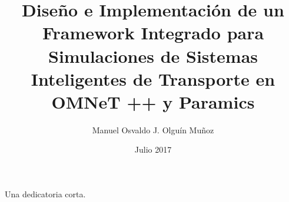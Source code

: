 \documentclass[upright, contnum, latin1]{umemoria}
\author{Manuel Osvaldo J. Olguín Muñoz}
\title{Diseño e Implementación de un Framework Integrado para Simulaciones de Sistemas Inteligentes de Transporte en OMNeT ++ y Paramics}
\date{Julio 2017}
\begin{document}
\frontmatter
\maketitle

\begin{abstract}
\lipsum[1-4]
\end{abstract}

\begin{dedicatoria}
Una dedicatoria corta.
\end{dedicatoria}

\begin{thanks}
\lipsum[1-2]
\end{thanks}

\cleardoublepage
\tableofcontents
\cleardoublepage
\listoftables
\cleardoublepage
\listoffigures

\mainmatter




\nocite{*}
\newpage
\begin{multicols}{2}
    
    
\end{multicols}
\end{document}
